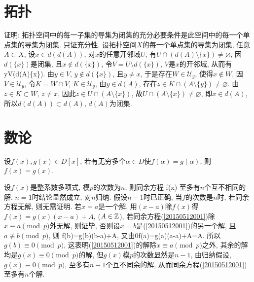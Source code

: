 
\section{拓扑}
证明: 拓扑空间中的每一子集的导集为闭集的充分必要条件是此空间中的每一个单点集的导集为闭集.
\et
\ba
只证充分性. 设拓扑空间$X$的每一个单点集的导集为闭集, 任意$A\subset X$, 设$x\in d(d(A))$, 对$x$的任意开邻域$U$,
有$U\cap(d(A)\setminus\{x\})\ne\varnothing$, 因$d(\{x\})$是闭集, 且$x\not\in d(\{x\})$, 令$V=U\setminus d(\{x\})$, 
$V$是$x$的开邻域, 从而有
\bee
y\in V\cap(d(A)\setminus\{x\}).
\eee
由$y\in V$, $y\not\in d(\{x\})$, 且$y\ne x$, 于是存在$W\in\mathscr{U}_y$, 使得$x\not\in W$, 因$V\in\mathscr{U}_y$, 
令$K=W\cap V$, $K\in\mathscr{U}_y$, 由$y\in d(A)$, 存在$z\in K\cap(A\setminus\{y\})\ne\varnothing$.
由$z\in K\subset W$, $z\ne x$, 因此$z\in U\cap(A\setminus\{x\})$, 故$U\cap(A\setminus\{x\})\ne\varnothing$,
即$x\in d(A)$, 所以$d(d(A))\subset d(A)$, $d(A)$为闭集.
\ea


\section{数论}
设$f(x),g(x)\in D[x]$, 若有无穷多个$\alpha\in D$使$f(\alpha)=g(\alpha)$, 则$f(x)=g(x)$.
\et

设$f(x)$是整系数多项式, 模$p$的次数为$n$, 则同余方程
\be\label{20150512001}
f(x)
\ee
至多有$n$个互不相同的解.
\et
\ba
$n=1$时结论显然成立, 对$n$归纳. 假设$n-1$时已正确, 当$f$的次数是$n$时, 若同余方程无解, 则无需证明.
若$x=a$是一个解, 用$(x-a)$除$f(x)$得$f(x)=g(x)(x-a)+A$, ($A\in\Bbb Z$), 若同余方程(\ref{20150512001})除$x\equiv a\pmod{p}$外无解, 则证毕, 
否则设$x=b$是(\ref{20150512001})的另一个解, 且$a\not\equiv b\pmod{p}$, 则
\equiv f(b)=g(b)(b-a)+A, \textrm{又由}0\equiv f(a)=g(a)(a-a)+A=A.
\eee
所以$g(b)\equiv0\pmod{p}$, 这表明(\ref{20150512001})的解除$x\equiv a\pmod{p}$之外, 其余的解均是$g(x)\equiv0\pmod{p}$的解, 
但$g(x)$模$p$的次数显然是$n-1$, 由归纳假设, $g(x)\equiv 0\pmod{p}$, 至多有$n-1$个互不同余的解, 从而同余方程(\ref{20150512001})至多有$n$个解.
\ea

